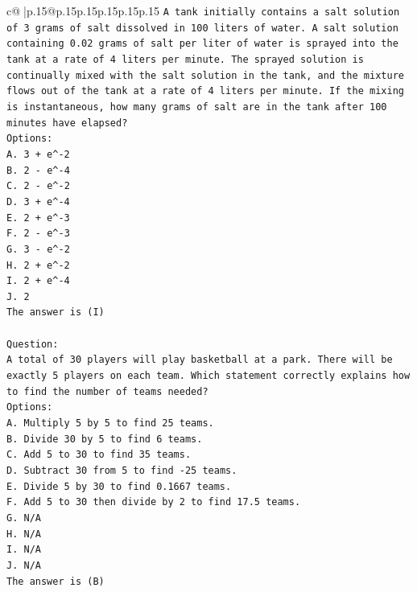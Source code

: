 \documentclass{article}
\begin{document}
{\begin{supertabular}{c@{$\;$}|p{.15\linewidth}@{}p{.15\linewidth}p{.15\linewidth}p{.15\linewidth}p{.15\linewidth}p{.15\linewidth}}
{{{\texttt{A tank initially contains a salt solution of 3 grams of salt dissolved in 100 liters of water. A salt solution containing 0.02 grams of salt per liter of water is sprayed into the tank at a rate of 4 liters per minute. The sprayed solution is continually mixed with the salt solution in the tank, and the mixture flows out of the tank at a rate of 4 liters per minute. If the mixing is instantaneous, how many grams of salt are in the tank after 100 minutes have elapsed?} \\
\texttt{Options:} \\
\texttt{A. 3 + e\^{}{-}2} \\
\texttt{B. 2 {-} e\^{}{-}4} \\
\texttt{C. 2 {-} e\^{}{-}2} \\
\texttt{D. 3 + e\^{}{-}4} \\
\texttt{E. 2 + e\^{}{-}3} \\
\texttt{F. 2 {-} e\^{}{-}3} \\
\texttt{G. 3 {-} e\^{}{-}2} \\
\texttt{H. 2 + e\^{}{-}2} \\
\texttt{I. 2 + e\^{}{-}4} \\
\texttt{J. 2} \\
\texttt{The answer is (I)} \\
\\ 
\texttt{Question:} \\
\texttt{A total of 30 players will play basketball at a park. There will be exactly 5 players on each team. Which statement correctly explains how to find the number of teams needed?} \\
\texttt{Options:} \\
\texttt{A. Multiply 5 by 5 to find 25 teams.} \\
\texttt{B. Divide 30 by 5 to find 6 teams.} \\
\texttt{C. Add 5 to 30 to find 35 teams.} \\
\texttt{D. Subtract 30 from 5 to find {-}25 teams.} \\
\texttt{E. Divide 5 by 30 to find 0.1667 teams.} \\
\texttt{F. Add 5 to 30 then divide by 2 to find 17.5 teams.} \\
\texttt{G. N/A} \\
\texttt{H. N/A} \\
\texttt{I. N/A} \\
\texttt{J. N/A} \\
\texttt{The answer is (B)} \\
\\ 
}}}
\end{supertabular}}
\end{document}
